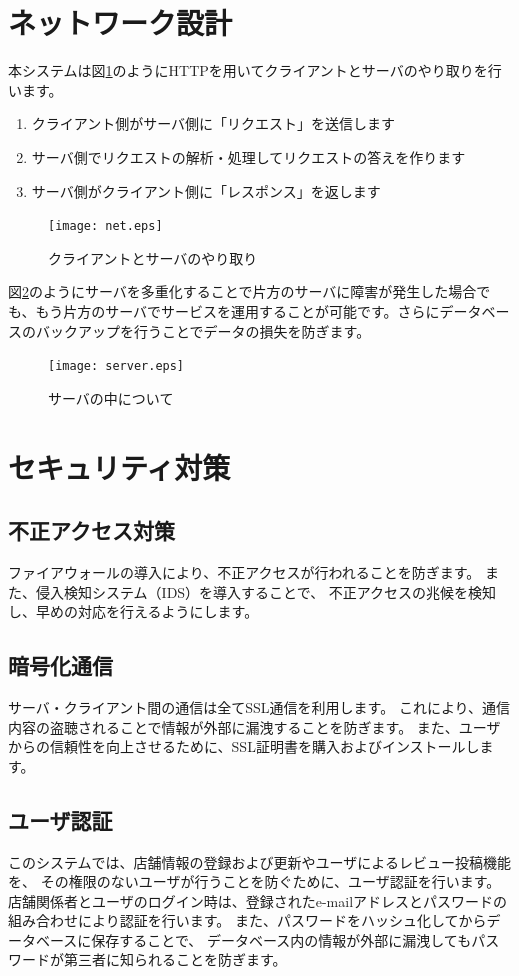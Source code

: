 \documentclass[a4j,titlepage]{jarticle}
\begin{document}
\section{ネットワーク設計}
本システムは図\ref{net}のようにHTTPを用いてクライアントとサーバのやり取りを行います。
\begin{enumerate}
  \item クライアント側がサーバ側に「リクエスト」を送信します
  \item サーバ側でリクエストの解析・処理してリクエストの答えを作ります
  \item サーバ側がクライアント側に「レスポンス」を返します
\end{enumerate}
\begin{figure}[h]
  \begin{center}
    \texttt{[image: net.eps]}
    \caption{クライアントとサーバのやり取り}
    \label{net}
  \end{center}
\end{figure}

図\ref{server}のようにサーバを多重化することで片方のサーバに障害が発生した場合でも、もう片方のサーバでサービスを運用することが可能です。さらにデータベースのバックアップを行うことでデータの損失を防ぎます。
\begin{figure}[h]
  \begin{center}
    \texttt{[image: server.eps]}
    \caption{サーバの中について}
    \label{server}
  \end{center}
\end{figure}


\section{セキュリティ対策}
\subsection{不正アクセス対策}
ファイアウォールの導入により、不正アクセスが行われることを防ぎます。
また、侵入検知システム（IDS）を導入することで、
不正アクセスの兆候を検知し、早めの対応を行えるようにします。
\subsection{暗号化通信}
サーバ・クライアント間の通信は全てSSL通信を利用します。
これにより、通信内容の盗聴されることで情報が外部に漏洩することを防ぎます。
また、ユーザからの信頼性を向上させるために、SSL証明書を購入およびインストールします。
\subsection{ユーザ認証}
このシステムでは、店舗情報の登録および更新やユーザによるレビュー投稿機能を、
その権限のないユーザが行うことを防ぐために、ユーザ認証を行います。
店舗関係者とユーザのログイン時は、登録されたe-mailアドレスとパスワードの組み合わせにより認証を行います。
また、パスワードをハッシュ化してからデータベースに保存することで、
データベース内の情報が外部に漏洩してもパスワードが第三者に知られることを防ぎます。
\end{document}
